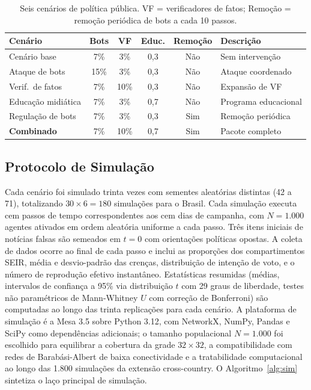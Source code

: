 \documentclass[12pt,a4paper]{article}
\theoremstyle{definition}
\theoremstyle{plain}
\begin{document}
\begin{table}[H]
\centering
\small
\setlength{\tabcolsep}{5pt}
\begin{tabular}{lccccl}
\toprule
\textbf{Cenário} & \textbf{Bots} & \textbf{VF} & \textbf{Educ.} & \textbf{Remoção} & \textbf{Descrição} \\
\midrule
Cenário base       & 7\%  & 3\%  & 0,3 & Não & Sem intervenção \\
Ataque de bots     & 15\% & 3\%  & 0,3 & Não & Ataque coordenado \\
Verif.\ de fatos   & 7\%  & 10\% & 0,3 & Não & Expansão de VF \\
Educação midiática & 7\%  & 3\%  & 0,7 & Não & Programa educacional \\
Regulação de bots  & 7\%  & 3\%  & 0,3 & Sim & Remoção periódica \\
\textbf{Combinado} & 7\%  & 10\% & 0,7 & Sim & Pacote completo \\
\bottomrule
\end{tabular}
\caption{Seis cenários de política pública. VF = verificadores de fatos; Remoção = remoção periódica de bots a cada 10 passos.}
\label{tab:scenarios}
\end{table}

\subsection{Protocolo de Simulação}
\label{subsec:protocol}

Cada cenário foi simulado trinta vezes com sementes aleatórias distintas (42 a 71), totalizando $30 \times 6 = 180$ simulações para o Brasil. Cada simulação executa cem passos de tempo correspondentes aos cem dias de campanha, com $N = 1{.}000$ agentes ativados em ordem aleatória uniforme a cada passo. Três itens iniciais de notícias falsas são semeados em $t=0$ com orientações políticas opostas. A coleta de dados ocorre ao final de cada passo e inclui as proporções dos compartimentos SEIR, média e desvio-padrão das crenças, distribuição de intenção de voto, e o número de reprodução efetivo instantâneo. Estatísticas resumidas (médias, intervalos de confiança a 95\% via distribuição $t$ com 29 graus de liberdade, testes não paramétricos de Mann-Whitney $U$ com correção de Bonferroni) são computadas ao longo das trinta replicações para cada cenário. A plataforma de simulação é a Mesa 3.5 sobre Python 3.12, com NetworkX, NumPy, Pandas e SciPy como dependências adicionais; o tamanho populacional $N = 1{.}000$ foi escolhido para equilibrar a cobertura da grade $32 \times 32$, a compatibilidade com redes de Barabási-Albert de baixa conectividade e a tratabilidade computacional ao longo das 1.800 simulações da extensão cross-country. O Algoritmo~\ref{alg:sim} sintetiza o laço principal de simulação.
\end{document}
